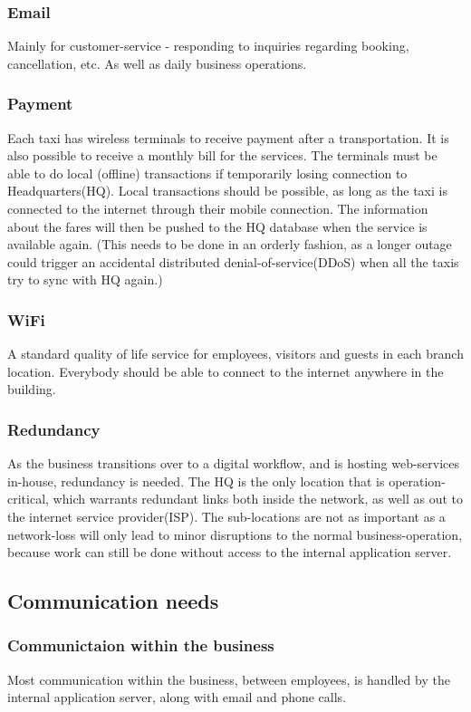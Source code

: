 \subsubsection{Email}
Mainly for customer-service - responding to inquiries regarding booking, cancellation, etc.
As well as daily business operations.

\subsubsection{Payment}
Each taxi has wireless terminals to receive payment after a transportation. It is also possible to receive a monthly bill for the services. The terminals must be able to do local (offline) transactions if temporarily losing connection to Headquarters(HQ).
Local transactions should be possible, as long as the taxi is connected to the internet through their mobile connection. 
The information about the fares will then be pushed to the HQ database when the service is available again. (This needs to be done in an orderly fashion, as a longer outage could trigger an accidental distributed denial-of-service(DDoS) when all the taxis try to sync with HQ again.)

\subsubsection{WiFi}
A standard quality of life service for employees, visitors and guests in each branch location. 
Everybody should be able to connect to the internet anywhere in the building.

\subsubsection{Redundancy}
As the business transitions over to a digital workflow, and is hosting web-services in-house, redundancy is needed.
The HQ is the only location that is operation-critical, which warrants redundant links both inside the network, as well as out to the internet service provider(ISP). 
The sub-locations are not as important as a network-loss will only lead to minor disruptions to the normal business-operation, because work can still be done without access to the internal application server.

\subsection{Communication needs}

\subsubsection{Communictaion within the business}
Most communication within the business, between employees, is handled by the internal application server, along with email and phone calls.

